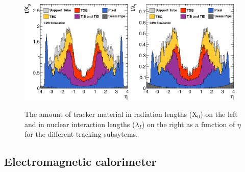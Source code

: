 \begin{figure}
  \includegraphics[width=0.48\textwidth]{cms_experiment/plots/tracker_material.png}
  \includegraphics[width=0.48\textwidth]{cms_experiment/plots/tracker_material_lambda.png}
  \caption[CMS tracker material budget]{The amount of \CMS tracker material in radiation lengths (X$_{0}$) on the left and in nuclear interaction lengths ($\lambda_{I}$) on the right as a function of $\eta$ for the different tracking subsytems.}
  \label{fig:tracker_material}
\end{figure}

\subsection{Electromagnetic calorimeter}
\label{sec:ecal}

